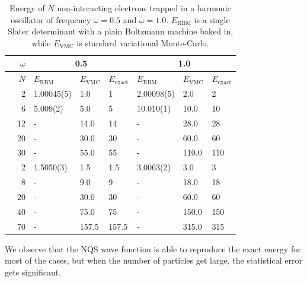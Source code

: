 \begin{table} [H]
	\caption{Energy of $N$ non-interacting electrons trapped in a harmonic oscillator of frequency $\omega=0.5$ and $\omega=1.0$. $E_{\text{RBM}}$ is a single Slater determinant with a plain Boltzmann machine baked in, while $E_{\text{VMC}}$ is standard variational Monte-Carlo.}
	\label{tab:quantumdotswointeraction}
	\begin{tabularx}{\textwidth}{r|r|XXX:XXX} \hline\hline
		\label{tab:nn}
		& $\omega$ & &\\ \hline
		& $N$ & $E_{\text{RBM}}$ & $E_{\text{VMC}}$ & $E_{\text{exact}}$ & $E_{\text{RBM}}$ & $E_{\text{VMC}}$ & $E_{\text{exact}}$ \\ \hline
		
		\parbox[t]{2mm}{}
		&2 & 1.00045(5) & 1.0 & 1 & 2.00098(5) & 2.0 & 2\\
		&6 & 5.009(2) & 5.0 & 5 & 10.010(1) & 10.0 & 10 \\
		&12 & - & 14.0 & 14 & - & 28.0 & 28\\
		&20 & - & 30.0 & 30 & - & 60.0 & 60\\
		&30 & - & 55.0 & 55 & - & 110.0 & 110\\ \hline
		
		\parbox[t]{2mm}{}
		&2 & 1.5050(3) & 1.5 & 1.5 & 3.0063(2) & 3.0 & 3 \\
		&8 & - & 9.0 & 9 & - & 18.0 & 18 \\
		&20 & - & 30.0 & 30 & - & 60.0 & 60 \\
		&40 & - & 75.0 & 75 & - & 150.0 & 150 \\
		&70 & - & 157.5 & 157.5 & - & 315.0 & 315 \\ \hline\hline
	\end{tabularx}
\end{table}
We observe that the NQS wave function is able to reproduce the exact energy for most of the cases, but when the number of particles get large, the statistical error gets significant.

